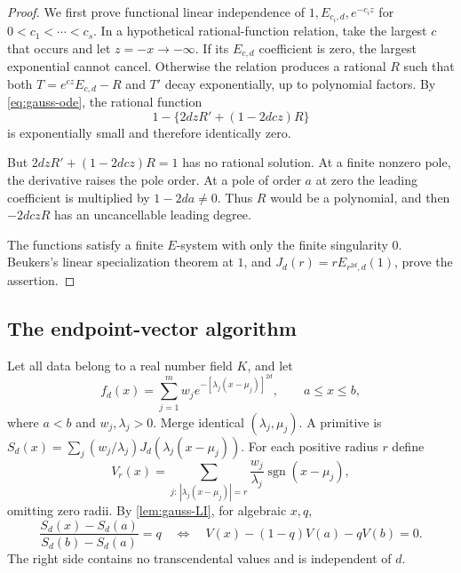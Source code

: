 \documentclass[11pt,a4paper]{article}
\numberwithin{equation}{section}
\newtheorem{lemma}[theorem]{Lemma}
\theoremstyle{definition}
\theoremstyle{remark}
\newcommand{\Qb}{\overline{\mathbb Q}}
\newcommand{\sgn}{\operatorname{sgn}}
\begin{document}
\begin{proof}
We first prove functional linear independence of
$1,E_{c_i,d},e^{-c_i z}$ for $0<c_1<\cdots<c_s$.
In a hypothetical rational-function relation, take the largest $c$ that
occurs and let $z=-x\to-\infty$. If its $E_{c,d}$ coefficient is zero, the
largest exponential cannot cancel. Otherwise the relation produces a rational
$R$ such that both $T=e^{cz}E_{c,d}-R$ and $T'$ decay exponentially, up to
polynomial factors. By \eqref{eq:gauss-ode}, the rational function
\[
 1-\{2dzR'+(1-2dcz)R\}
\]
is exponentially small and therefore identically zero.

But $2dzR'+(1-2dcz)R=1$ has no rational solution. At a finite nonzero pole,
the derivative raises the pole order. At a pole of order $a$ at zero the
leading coefficient is multiplied by $1-2da\ne0$. Thus $R$ would be a
polynomial, and then $-2dczR$ has an uncancellable leading degree.

The functions satisfy a finite $E$-system with only the finite singularity
$0$. Beukers's linear specialization theorem at $1$, and
$J_d(r)=rE_{r^{2d},d}(1)$, prove the assertion.
\end{proof}

\subsection{The endpoint-vector algorithm}
Let all data belong to a real number field $K$, and let
\begin{equation}\label{eq:mixture}
 f_d(x)=\sum_{j=1}^{m}w_j
 e^{-[\lambda_j(x-\mu_j)]^{2d}},\qquad a\le x\le b,
\end{equation}
where $a<b$ and $w_j,\lambda_j>0$. Merge identical $(\lambda_j,\mu_j)$.
A primitive is $S_d(x)=\sum_j(w_j/\lambda_j)J_d(\lambda_j(x-\mu_j))$.
For each positive radius $r$ define
\begin{equation}
 V_r(x)=\sum_{j:\,|\lambda_j(x-\mu_j)|=r}
 \frac{w_j}{\lambda_j}\sgn(x-\mu_j),
\end{equation}
omitting zero radii. By \cref{lem:gauss-LI}, for algebraic $x,q$,
\begin{equation}\label{eq:vector-criterion}
 \frac{S_d(x)-S_d(a)}{S_d(b)-S_d(a)}=q
 \quad\Longleftrightarrow\quad
 V(x)-(1-q)V(a)-qV(b)=0.
\end{equation}
The right side contains no transcendental values and is independent of $d$.
\end{document}
